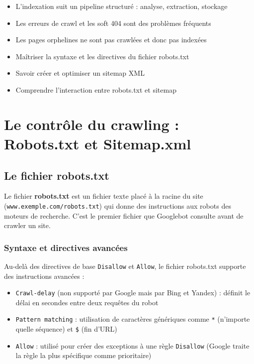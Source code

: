 \documentclass[12pt,a4paper,twoside]{report}
\newcommand{\keyword}[1]{\textbf{\textcolor{googleblue}{#1}}}
\newcommand{\level}[1]{\medskip\bigskip}
\begin{document}
\begin{takeaways}
\begin{itemize}
    \item L'indexation suit un pipeline structuré : analyse, extraction, stockage
    \item Les erreurs de crawl et les soft 404 sont des problèmes fréquents
    \item Les pages orphelines ne sont pas crawlées et donc pas indexées
\end{itemize}
\end{takeaways}

\level{2}
\begin{objectives}
\begin{itemize}
    \item Maîtriser la syntaxe et les directives du fichier robots.txt
    \item Savoir créer et optimiser un sitemap XML
    \item Comprendre l'interaction entre robots.txt et sitemap
\end{itemize}
\end{objectives}

\chapter{Le contrôle du crawling : Robots.txt et Sitemap.xml}
\label{ch:controle}

\section{Le fichier robots.txt}

Le fichier \keyword{robots.txt} est un fichier texte placé à la racine du site (\texttt{www.exemple.com/robots.txt}) qui donne des instructions aux robots des moteurs de recherche. C'est le premier fichier que Googlebot consulte avant de crawler un site.

\subsection{Syntaxe et directives avancées}

Au-delà des directives de base \texttt{Disallow} et \texttt{Allow}, le fichier robots.txt supporte des instructions avancées :

\begin{itemize}
    \item \texttt{Crawl-delay} (non supporté par Google mais par Bing et Yandex) : définit le délai en secondes entre deux requêtes du robot 
    \item \texttt{Pattern matching} : utilisation de caractères génériques comme \texttt{*} (n'importe quelle séquence) et \texttt{\$} (fin d'URL)
    \item \texttt{Allow} : utilisé pour créer des exceptions à une règle \texttt{Disallow} (Google traite la règle la plus spécifique comme prioritaire)
\end{itemize}
\end{document}
